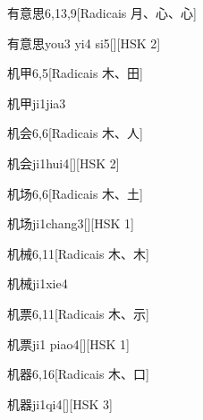 \begin{entry}{有意思}{6,13,9}[Radicais ⽉、⼼、⼼]
  \begin{phonetics}{有意思}{you3 yi4 si5}[][HSK 2]
  \end{phonetics}
\end{entry}

\begin{entry}{机甲}{6,5}[Radicais ⽊、⽥]
  \begin{phonetics}{机甲}{ji1jia3}
  \end{phonetics}
\end{entry}

\begin{entry}{机会}{6,6}[Radicais ⽊、⼈]
  \begin{phonetics}{机会}{ji1hui4}[][HSK 2]
  \end{phonetics}
\end{entry}

\begin{entry}{机场}{6,6}[Radicais ⽊、⼟]
  \begin{phonetics}{机场}{ji1chang3}[][HSK 1]
  \end{phonetics}
\end{entry}

\begin{entry}{机械}{6,11}[Radicais ⽊、⽊]
  \begin{phonetics}{机械}{ji1xie4}
  \end{phonetics}
\end{entry}

\begin{entry}{机票}{6,11}[Radicais ⽊、⽰]
  \begin{phonetics}{机票}{ji1 piao4}[][HSK 1]
  \end{phonetics}
\end{entry}

\begin{entry}{机器}{6,16}[Radicais ⽊、⼝]
  \begin{phonetics}{机器}{ji1qi4}[][HSK 3]
  \end{phonetics}
\end{entry}

